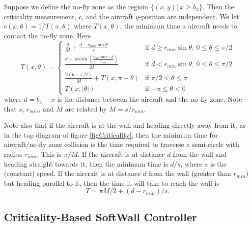 \documentclass[11pt]{article}
\begin{document}
Suppose we define the no-fly zone as the regioin $\{(x,y)|\ x \geq b_{x}\}$. Then the
criticality measurement, $c$, and the aircraft $y$-position are
independent. We let  $c(x, \theta) = 1 / T(x, \theta)$ where
$T(x, \theta)$, the minimum time a aircraft needs to contact the no-fly
zone.  Here
\begin{equation}
T(x, \theta) = \left\{ \begin{array}{ll}
\frac{\theta}{M} + \frac{d - r_{min}\sin{\theta}}{s} & \mbox{if $d \geq r_{min}\sin{\theta},\ 0 \leq \theta \leq \pi/2$} \\
\frac{\theta - \arcsin{\left( \frac{r_{min}\sin{\theta}- d}{r_{min}}\right) }}{M} & \mbox{if $d < r_{min}\sin{\theta},\ 0 \leq \theta \leq \pi/2$} \\
\frac{2(\theta - \pi/2)}{M} + T(x, \pi - \theta) & \mbox{if $\pi/2 < \theta \leq \pi$} \\
T(x, |\theta|) & \mbox{if $-\pi \leq \theta < 0$}
\end{array}
\right. \label{eq:bigT}
\end{equation}
where $d = b_{x} - x$ is the distance between the aircraft and the no-fly zone.
Note that $s$, $r_{min}$, and $M$ are related by $M = s/r_{min}$.

Note also that if the aircraft is at the wall and heading directly
away from it, as in the top diagram of figure \ref{figCriticality},
then the minimum time for aircraft/no-fly zone collision is the time
required to traverse a semi-circle with radius $r_{min}$.  This is
$\pi/M$.  If the aircraft is at distance $d$ from the wall and heading
straight towards it, then the minimum time is $d/s$, where $s$ is the
(constant) speed.  If the aircraft is at distance $d$ from the wall
(greater than $r_{min}$) but heading parallel to it, then the time it
will take to reach the wall is
\[
T = \pi M/2+(d-r_{min})/s .
\]


\subsection{Criticality-Based SoftWall Controller}
\end{document}
